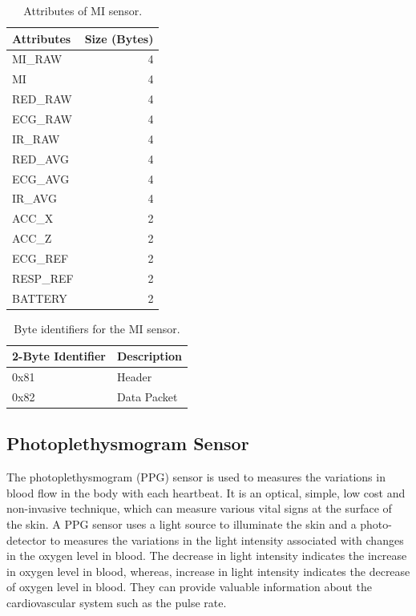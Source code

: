 \renewcommand{\arraystretch}{2}
\begin{table}
	\caption{Attributes of MI sensor.} \label{tab:att_mi}
	
	\begin{center}
		\begin{tabular}{ | l | r | }
			\hline
			\textbf{Attributes} & \textbf{Size (Bytes)} \\ \hline
			MI\_RAW  & 4 \\ \hline
			MI  & 4  \\ \hline
			RED\_RAW  & 4  \\ \hline
			ECG\_RAW  & 4  \\ \hline
			IR\_RAW  & 4  \\ \hline
			RED\_AVG  & 4  \\ \hline
			ECG\_AVG  & 4  \\ \hline
			IR\_AVG  & 4  \\ \hline
			ACC\_X  & 2  \\ \hline
			ACC\_Z  & 2  \\ \hline
			ECG\_REF  & 2  \\ \hline
			RESP\_REF  & 2  \\ \hline
			BATTERY  & 2  \\ \hline
		\end{tabular}
	\end{center}
	
\end{table}


\renewcommand{\arraystretch}{2}
\begin{table}
	\caption{Byte identifiers for the MI sensor.} \label{tab:bi_mi}
	
	\begin{center}
		\begin{tabular}{ | l | l | }
			\hline
			\textbf{2-Byte Identifier} & \textbf{Description} \\ \hline
			0x81  & Header \\ \hline
			0x82  & Data Packet  \\ \hline
		\end{tabular}
	\end{center}
	
\end{table}

\subsection{Photoplethysmogram Sensor} \label{sec:ppg_def}
The photoplethysmogram (PPG) sensor is used to measures the variations in blood flow in the body with each heartbeat. It is an optical, simple, low cost and non-invasive technique, which can measure various vital signs at the surface of the skin. A PPG sensor uses a light source to illuminate the skin and a photo-detector to measures the variations in the light intensity associated with changes in the oxygen level in blood. The decrease in light intensity indicates the increase in oxygen level in blood, whereas, increase in light intensity indicates the decrease of oxygen level in blood. They can provide valuable information about the cardiovascular system such as the pulse rate.

